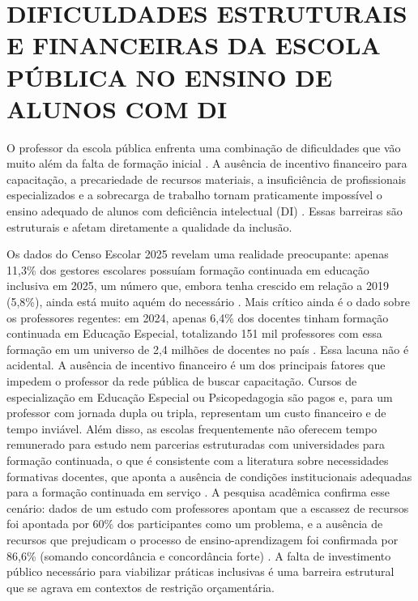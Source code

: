 \section{DIFICULDADES ESTRUTURAIS E FINANCEIRAS DA ESCOLA PÚBLICA NO ENSINO DE ALUNOS COM DI}
\label{dificuldades_estruturais}

O professor da escola pública enfrenta uma combinação de dificuldades que vão muito além da falta de formação inicial \cite{irm2026panorama}. A ausência de incentivo financeiro para capacitação, a precariedade de recursos materiais, a insuficiência de profissionais especializados e a sobrecarga de trabalho tornam praticamente impossível o ensino adequado de alunos com deficiência intelectual (DI) \cite{cunha2025recursos,lievore2025financiamento}. Essas barreiras são estruturais e afetam diretamente a qualidade da inclusão.

Os dados do Censo Escolar 2025 revelam uma realidade preocupante: apenas 11,3\% dos gestores escolares possuíam formação continuada em educação inclusiva em 2025, um número que, embora tenha crescido em relação a 2019 (5,8\%), ainda está muito aquém do necessário \cite{irm2026panorama}. Mais crítico ainda é o dado sobre os professores regentes: em 2024, apenas 6,4\% dos docentes tinham formação continuada em Educação Especial, totalizando 151 mil professores com essa formação em um universo de 2,4 milhões de docentes no país \cite{irm2026panorama}. Essa lacuna não é acidental. A ausência de incentivo financeiro é um dos principais fatores que impedem o professor da rede pública de buscar capacitação. Cursos de especialização em Educação Especial ou Psicopedagogia são pagos e, para um professor com jornada dupla ou tripla, representam um custo financeiro e de tempo inviável. Além disso, as escolas frequentemente não oferecem tempo remunerado para estudo nem parcerias estruturadas com universidades para formação continuada, o que é consistente com a literatura sobre necessidades formativas docentes, que aponta a ausência de condições institucionais adequadas para a formação continuada em serviço \cite{becker2026necessidades,educacaointegral2026}. A pesquisa acadêmica confirma esse cenário: dados de um estudo com professores apontam que a escassez de recursos foi apontada por 60\% dos participantes como um problema, e a ausência de recursos que prejudicam o processo de ensino-aprendizagem foi confirmada por 86,6\% (somando concordância e concordância forte) \cite{cunha2025recursos}. A falta de investimento público necessário para viabilizar práticas inclusivas é uma barreira estrutural que se agrava em contextos de restrição orçamentária.

